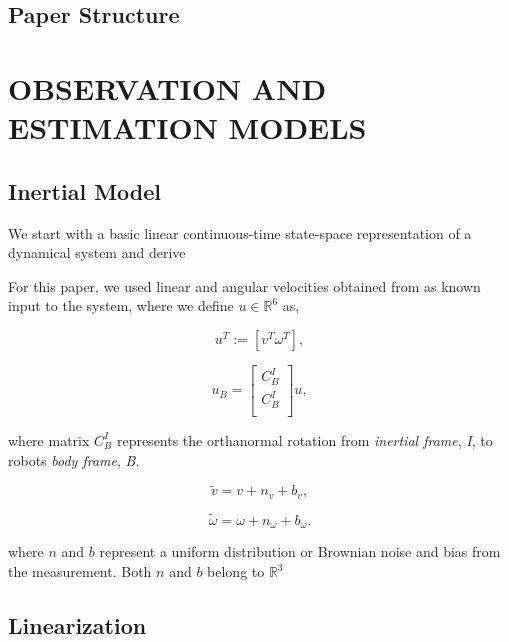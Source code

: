\documentclass[letterpaper, 10 pt, conference]{ieeeconf}  %
\newcommand{\transpose}[1]{\ensuremath{#1^{\scriptscriptstyle T}}}
\begin{document}
\subsection{Paper Structure}


\section{OBSERVATION AND ESTIMATION MODELS}

\subsection{Inertial Model}

We start with a basic linear continuous-time state-space representation of a dynamical system and derive


For this paper, we used linear and angular velocities obtained from  as known input
to the system, where we define $u \in \mathbb{R}^6$ as,

\begin{equation} \label{eq:1}
\transpose{u} := \left[ \transpose{v} \transpose{\omega} \right],
\end{equation}

\begin{equation} \label{eq:2}
u_{B} =
\begin{bmatrix}
        {C}^{I}_{B}  \\
        {C}^{I}_{B}  \\
\end{bmatrix} u,
\end{equation}

\noindent
where matrix ${C}^{I}_{B}$ represents the orthanormal rotation from \textit{inertial frame},
\textit{I}, to robots \textit{body frame}, \textit{B}.



\begin{equation} \label{eq:3}
\widetilde{v}= v + n_{v} + b_{v},
\end{equation}


\begin{equation} \label{eq:4}
\widetilde{\omega} = \omega + n_{\omega} + b_{\omega}.
\end{equation}

\noindent
where $n$ and $b$ represent a uniform distribution or Brownian noise and bias from the measurement. Both $n$ and $b$ belong to $\mathbb{R}^3$


\subsection{Linearization}
\end{document}
